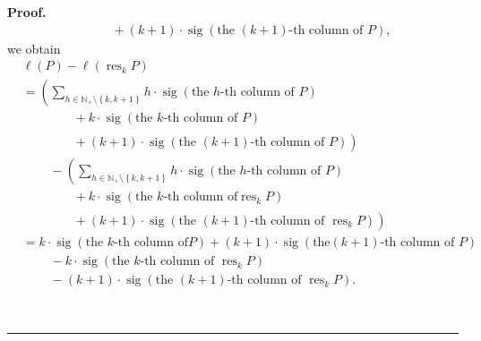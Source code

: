 \documentclass[numbers=enddot,12pt,final,onecolumn,notitlepage]{scrartcl}%
\theoremstyle{definition}
\newenvironment{proof}[1][Proof]{\noindent\textbf{#1.} }{\ \rule{0.5em}{0.5em}}
\let\sumnonlimits\sum
\renewcommand{\sum}{\sumnonlimits\limits}
\begin{document}
\begin{proof}
\begin{align*}
&  \ \ \ \ \ \ \ \ \ \ +\left(  k+1\right)  \cdot\operatorname*{sig}\left(
\text{the }\left(  k+1\right)  \text{-th column of }P\right)  ,
\end{align*}
we obtain%
\begin{align}
&  \ell\left(  P\right)  -\ell\left(  \operatorname*{res}\nolimits_{k}P\right)
\nonumber\\
&  =\left(  \sum_{h\in\mathbb{N}_{+}\setminus\left\{  k,k+1\right\}  }%
h\cdot\operatorname*{sig}\left(  \text{the }h\text{-th column of }P\right)
\right. \nonumber\\
&  \ \ \ \ \ \ \ \ \ \ \left.
\phantom{\sum_{h}}%
+k\cdot\operatorname*{sig}\left(  \text{the }k\text{-th column of }P\right)
\right. \nonumber\\
&  \ \ \ \ \ \ \ \ \ \ \left.
\phantom{\sum_{h}}%
+\left(  k+1\right)  \cdot\operatorname*{sig}\left(  \text{the }\left(
k+1\right)  \text{-th column of }P\right)  \right) \nonumber\\
&  \ \ \ \ \ \ \ \ \ \ -\left(  \sum_{h\in\mathbb{N}_{+}\setminus\left\{
k,k+1\right\}  }h\cdot\operatorname*{sig}\left(  \text{the }h\text{-th column
of }P\right)  \right. \nonumber\\
&  \ \ \ \ \ \ \ \ \ \ \left.
\phantom{\sum_{h}}%
+k\cdot\operatorname*{sig}\left(  \text{the }k\text{-th column of
}\operatorname*{res}\nolimits_{k}P\right)  \right. \nonumber\\
&  \ \ \ \ \ \ \ \ \ \ \left.
\phantom{\sum_{h}}%
+\left(  k+1\right)  \cdot\operatorname*{sig}\left(  \text{the }\left(
k+1\right)  \text{-th column of }\operatorname*{res}\nolimits_{k}P\right)
\right) \nonumber\\
&  =k\cdot\operatorname*{sig}\left(  \text{the }k\text{-th column of
}P\right)  +\left(  k+1\right)  \cdot\operatorname*{sig}\left(  \text{the
}\left(  k+1\right)  \text{-th column of }P\right) \nonumber\\
&  \ \ \ \ \ \ \ \ \ \ -k\cdot\operatorname*{sig}\left(  \text{the }k\text{-th
column of }\operatorname*{res}\nolimits_{k}P\right) \nonumber\\
&  \ \ \ \ \ \ \ \ \ \ -\left(  k+1\right)  \cdot\operatorname*{sig}\left(
\text{the }\left(  k+1\right)  \text{-th column of }\operatorname*{res}%
\nolimits_{k}P\right)  . \label{pf.lem.BK.res.lendec.pf.3}%
\end{align}



\end{proof}
\end{document}
